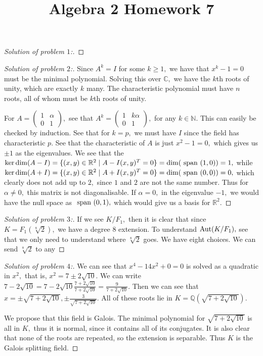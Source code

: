 \documentclass[letterpaper,11pt,twoside]{article}
\title{Algebra 2 Homework 7}
\theoremstyle{proposition}
\theoremstyle{definition}
\theoremstyle{theorem}
\theoremstyle{definition}
\theoremstyle{definition}
\theoremstyle{definition}
\theoremstyle{lemma}
\theoremstyle{definition}
\theoremstyle{definition}
\theoremstyle{corollary}
\theoremstyle{definition}
\theoremstyle{definition}
\theoremstyle{definition}
\renewcommand{\div}{\;\vert\;}
\DeclareMathOperator{\Aut}{\text{\rm Aut}}
\begin{document}
	\maketitle
	\begin{proof}[Solution of problem $1$:]
		
	\end{proof}
\begin{proof}[Solution of problem $2$:]
	Since $A^k = I$ for some $k \geq 1,$ we have that $x^k-1=0$ must be the minimal polynomial. Solving this over $\mathbb{C},$ we have the $k$th roots of 
	unity, which are exactly $k$ many. The characteristic polynomial must have $n$ roots, all of whom must be $k$th roots of unity. 
	
	For $A= \begin{pmatrix}
		1 & \alpha \\
		0 & 1
	\end{pmatrix},$ see that $A^k=  \begin{pmatrix}
	1 & k\alpha \\
	0 & 1
\end{pmatrix},$ for any $k \in \mathbb{N}.$ This can easily be checked by induction. See that for $k=p,$ we must have $I$ since the field has characteristic 
$p.$ See that the characteristic of $A$ is just $x^2-1=0,$ which gives us $\pm 1$ as the eigenvalues. We see that the $\ker \dim (A-I)= \{ (x,y) \in 
\mathbb{R}^2 \div A-I(x,y)^T=0  \}= \dim(\text{ \textrm span } (1,0))=1,$ while $\ker \dim (A+I)= \{ (x,y) \in \mathbb{R}^2 \div A+I(x,y)^T=0  \}= 
\dim(\text{ \textrm span } (0,0) )=0, $ which clearly does not add up to $2,$ since $1$ and $2$ are not the same number. Thus for $\alpha \neq 0,$ this 
matrix is not diagonalisable. If $\alpha=0,$ in the eigenvalue $-1,$ we would have the null space as $ \text{ \textrm span } (0,1),$ which would give us a 
basis for $\mathbb{R}^2.$
\end{proof}
\begin{proof}[Solution of problem $3$:]
	If we see $K/F_1,$ then it is clear that since $K= F_1(\sqrt[8]{2}),$ we have a degree $8$ extension. To understand $\Aut(K/F_1),$ see that we only need 
	to understand where $\sqrt[8]{2}$ goes. We have eight choices. We can send $\sqrt[8]{2}$ to any 
\end{proof}
\begin{proof}[Solution of problem $4$:]
		We can see that $x^4-14x^2+0=0$ is solved as a quadratic in $x^2,$ that is, $x^2= 7 \pm 2 \sqrt{10}.$ 
	We can write $7 -2 \sqrt{10}= 7-2\sqrt{10}\frac{7+2\sqrt{10}}{7+2\sqrt{10}}= \frac{9}{7+2\sqrt{10}}.$ 
	Then we can see that $x= \pm \sqrt{7+2\sqrt{10}}, \pm \frac{3}{\sqrt{7+2\sqrt{10}}}.$ All of these roots lie in $K=\mathbb{Q}(\sqrt{7+2\sqrt{10}}).$
	
	We propose that this field is Galois. The minimal polynomial for $\sqrt{7+2\sqrt{10}}$ is all in $K,$ thus it is normal, since it contains all of its 
	conjugates. It is also clear that none of the roots are repeated, so the extension is separable. Thus $K$ is the Galois splitting field.
\end{proof}
\end{document}
